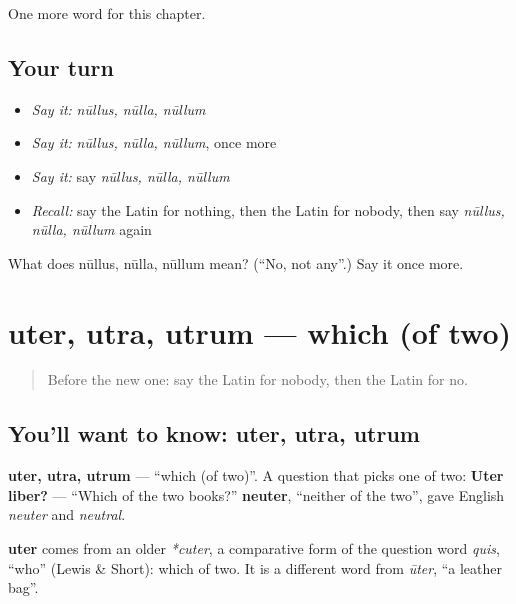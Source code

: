 \begin{grammarlens}[title={What you've built}]
One more word for this chapter.
\end{grammarlens}

\subsection*{Your turn}
\begin{itemize}
\raggedright
  \item \emph{Say it:} \emph{nūllus, nūlla, nūllum}
  \item \emph{Say it:} \emph{nūllus, nūlla, nūllum}, once more
  \item \emph{Say it:} say \emph{nūllus, nūlla, nūllum}
  \item \emph{Recall:} say the Latin for nothing, then the Latin for nobody, then say \emph{nūllus, nūlla, nūllum} again
\end{itemize}

\begin{tcolorbox}[breakable,colback=teal!4,colframe=teal!35!black,title={Before you move on}]
What does nūllus, nūlla, nūllum mean? (\textquotedblleft{}No, not any\textquotedblright{}.) Say it once more.
\end{tcolorbox}
\section[uter, utra, utrum]{uter, utra, utrum — which (of two)}

\label{lesson:LA-C161-uter}



\begin{quote}
Before the new one: say the Latin for nobody, then the Latin for no.
\end{quote}

\subsection*{You'll want to know: uter, utra, utrum}
\textbf{uter, utra, utrum} — \textquotedblleft{}which (of two)\textquotedblright{}. A question that picks one of two: \textbf{Uter liber?} — \textquotedblleft{}Which of the two books?\textquotedblright{} \textbf{neuter}, \textquotedblleft{}neither of the two\textquotedblright{}, gave English \emph{neuter} and \emph{neutral}.

\begin{cousinweb}
\textbf{uter} comes from an older \emph{*cuter}, a comparative form of the question word \emph{quis}, \textquotedblleft{}who\textquotedblright{} (Lewis \& Short): which of two. It is a different word from \emph{ūter}, \textquotedblleft{}a leather bag\textquotedblright{}.
\end{cousinweb}

